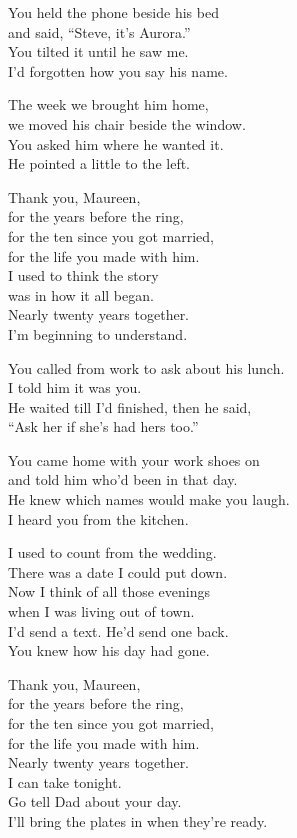 \begin{lyrics}
You held the phone beside his bed\\
and said, “Steve, it’s Aurora.”\\
You tilted it until he saw me.\\
I’d forgotten how you say his name.

The week we brought him home,\\
we moved his chair beside the window.\\
You asked him where he wanted it.\\
He pointed a little to the left.

Thank you, Maureen,\\
for the years before the ring,\\
for the ten since you got married,\\
for the life you made with him.\\
I used to think the story\\
was in how it all began.\\
Nearly twenty years together.\\
I’m beginning to understand.

You called from work to ask about his lunch.\\
I told him it was you.\\
He waited till I’d finished, then he said,\\
“Ask her if she’s had hers too.”

You came home with your work shoes on\\
and told him who’d been in that day.\\
He knew which names would make you laugh.\\
I heard you from the kitchen.

I used to count from the wedding.\\
There was a date I could put down.\\
Now I think of all those evenings\\
when I was living out of town.\\
I’d send a text. He’d send one back.\\
You knew how his day had gone.

Thank you, Maureen,\\
for the years before the ring,\\
for the ten since you got married,\\
for the life you made with him.\\
Nearly twenty years together.\\
I can take tonight.\\
Go tell Dad about your day.\\
I’ll bring the plates in when they’re ready.
\end{lyrics}

